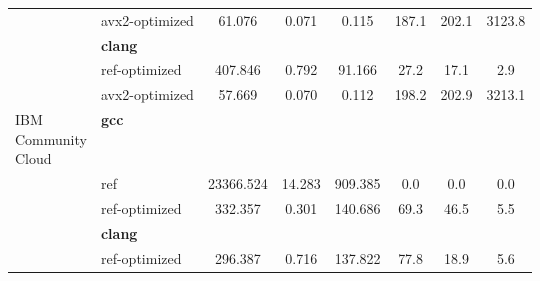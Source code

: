 \begin{table}[H]
\begin{tabularx}{\linewidth}{l l c c c c c c}
          & avx2-optimized & 61.076 & 0.071 & 0.115 & 187.1 & 202.1 & 3123.8\\
          & \textbf{clang} & & & & & \\
          & ref-optimized & 407.846 & 0.792 & 91.166 & 27.2 & 17.1 & 2.9\\
          & avx2-optimized & 57.669 & 0.070 & 0.112 & 198.2 & 202.9 & 3213.1\\
          \midrule
          \multirowcell{5}{IBM\\ Community\\ Cloud}
          & \textbf{gcc} & & & & & \\
          & ref & 23366.524 & 14.283 & 909.385 & 0.0 & 0.0 & 0.0\\
          & ref-optimized & 332.357 & 0.301 & 140.686 & 69.3 & 46.5 & 5.5\\
          & \textbf{clang} & & & & & \\
          & ref-optimized & 296.387 & 0.716 & 137.822 & 77.8 & 18.9 & 5.6\\
        \bottomrule
    \end{tabularx}
\end{table}